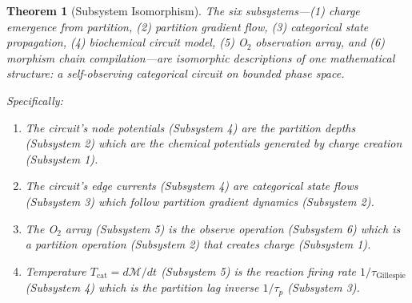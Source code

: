 \documentclass[twocolumn,10pt,a4paper]{article}
\newtheorem{theorem}{Theorem}[section]
\theoremstyle{definition}
\theoremstyle{remark}
\newcommand{\Depth}{\mathcal{M}}
\newcommand{\taup}{\tau_p}
\begin{document}
\begin{theorem}[Subsystem Isomorphism]
\label{thm:isomorphism}
The six subsystems---\textup{(1)} charge emergence from partition, \textup{(2)} partition gradient flow, \textup{(3)} categorical state propagation, \textup{(4)} biochemical circuit model, \textup{(5)} O$_2$ observation array, and \textup{(6)} morphism chain compilation---are isomorphic descriptions of one mathematical structure: a self-observing categorical circuit on bounded phase space.

Specifically:
\begin{enumerate}[label=\textup{(I\arabic*)}]
    \item The circuit's node potentials \textup{(Subsystem 4)} are the partition depths \textup{(Subsystem 2)} which are the chemical potentials generated by charge creation \textup{(Subsystem 1)}.
    \item The circuit's edge currents \textup{(Subsystem 4)} are categorical state flows \textup{(Subsystem 3)} which follow partition gradient dynamics \textup{(Subsystem 2)}.
    \item The O$_2$ array \textup{(Subsystem 5)} is the observe operation \textup{(Subsystem 6)} which is a partition operation \textup{(Subsystem 2)} that creates charge \textup{(Subsystem 1)}.
    \item Temperature $T_{\mathrm{cat}} = d\Depth/dt$ \textup{(Subsystem 5)} is the reaction firing rate $1/\tau_{\mathrm{Gillespie}}$ \textup{(Subsystem 4)} which is the partition lag inverse $1/\taup$ \textup{(Subsystem 3)}.
\end{enumerate}
\end{theorem}
\end{document}
